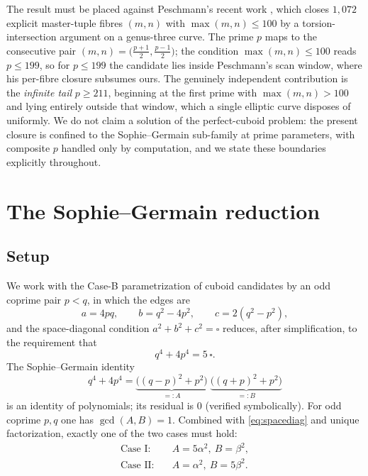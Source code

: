 \documentclass[11pt,reqno]{amsart}
\theoremstyle{plain}
\theoremstyle{definition}
\begin{document}
The result must be placed against Peschmann's recent work \cite{Pes1,Pes2}, which closes
$1{,}072$ explicit master-tuple fibres $(m,n)$ with $\max(m,n)\le 100$ by a
torsion-intersection argument on a genus-three curve. The prime $p$ maps
to the consecutive pair $(m,n)=\bigl(\tfrac{p+1}{2},\tfrac{p-1}{2}\bigr)$; the condition
$\max(m,n)\le 100$ reads $p\le 199$, so for $p\le 199$ the candidate
lies inside Peschmann's scan window, where his per-fibre closure subsumes ours. The
genuinely independent contribution is the \emph{infinite tail} $p\ge 211$, beginning at
the first prime with $\max(m,n)>100$ and lying entirely outside that window, which a
single elliptic curve disposes of uniformly. We do not claim a solution
of the perfect-cuboid problem: the present closure is confined to the Sophie--Germain
sub-family at prime parameters, with composite $p$ handled only by computation, and we
state these boundaries explicitly throughout.

\section{The Sophie--Germain reduction}

\subsection{Setup}
We work with the Case-B parametrization of cuboid candidates by an odd coprime pair
$p<q$, in which the edges are
\begin{equation}\label{eq:legs}
a=4pq,\qquad b=q^{2}-4p^{2},\qquad c=2(q^{2}-p^{2}),
\end{equation}
and the space-diagonal condition $a^{2}+b^{2}+c^{2}=\square$ reduces, after
simplification, to the requirement that
\begin{equation}\label{eq:spacediag}
q^{4}+4p^{4}=5\,\square .
\end{equation}
The Sophie--Germain identity
\begin{equation}\label{eq:SG}
q^{4}+4p^{4}=\underbrace{\bigl((q-p)^{2}+p^{2}\bigr)}_{=:A}\;
\underbrace{\bigl((q+p)^{2}+p^{2}\bigr)}_{=:B}
\end{equation}
is an identity of polynomials; its residual is $0$ (verified symbolically). For odd
coprime $p,q$ one has $\gcd(A,B)=1$. Combined with \eqref{eq:spacediag} and unique
factorization, exactly one of the two cases must hold:
\begin{align*}
\text{Case I:}&\quad A=5\alpha^{2},\ B=\beta^{2},\\
\text{Case II:}&\quad A=\alpha^{2},\ B=5\beta^{2}.
\end{align*}
\end{document}
